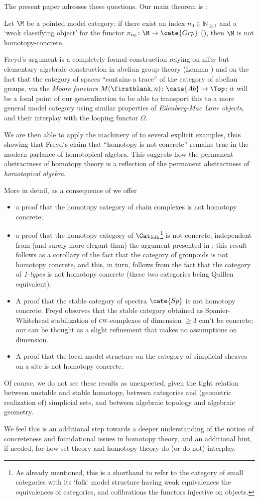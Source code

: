 The present paper adresses these questions. Our main theorem is
:
\begin{theorem*}
Let $\M$ be a pointed model category; if there exist an index $n_0 \in \mathbb{N}_{\ge
1}$ and a `weak classifying object' for the functor $\pi_{n_0} \colon \M \to
\cate{Grp}$ (\adef{}), then $\M$ is not homotopy\hyp{}concrete.
\end{theorem*}
Freyd's argument is a completely formal construction relying on nifty but elementary algebraic construction in abelian group theory (Lemma ) and on the fact that the category
of spaces ``contains a trace'' of the category of abelian groups, via the
\emph{Moore functors} $M(\firstblank,n) \colon \cate{Ab}\to \Top$; it will be a
focal point of our generalization to be able to transport this to a more general
model category using similar properties of \emph{Eilenberg-Mac Lane objects},
and their interplay with the looping functor $\Omega$.

We are then able to apply the machinery of \athm{} to several
explicit examples, thus showing that Freyd`s claim that ``homotopy is not
concrete'' remains true in the modern parlance of homotopical algebra. This
suggests how the permanent abstractness of homotopy theory is a reflection of
the permanent abstractness of \emph{homotopical algebra}.

More in detail, as a consequence of \athm{} we offer
\begin{itemize}
	\item a proof that the homotopy category of chain complexes is not homotopy concrete;
	\item a proof that the homotopy category of $\Cat_\text{folk}$\footnote{As
already mentioned, this is a shorthand to refer to the category of small
categories with its `folk' model structure having weak equivalences the
equivalences of categories, and cofibrations the functors injective on objects.}
is not concrete, independent from (and surely more elegant than) the argument
presented in \cite[§4.1]{fconc}; this result follows as a corollary of the fact
that the category of groupoids is not homotopy concrete, and this, in turn,
follows from the fact that the category of \emph{1-types} is not homotopy
concrete (these two categories being Quillen equivalent).
	\item A proof that the stable category of spectra $\cate{Sp}$ is not homotopy
concrete. Freyd \cite{Freydconc} observes that the stable category obtained as
Spanier-Whitehead stabilization of \textsc{cw}-complexes of dimension $\ge 3$
can't be concrete; our  can be thought as a slight refinement
that makes no assumptions on dimension.
	\item A proof that the local model structure
\cite{jardine1987simplical,dugger2004hypercovers} on the category of simplicial
sheaves on a site is not homotopy concrete.
\end{itemize}
Of course, we do not see these results as unexpected, given the tight relation
between unstable and stable homotopy, between categories and (geometric
realization of) simplicial sets, and between algebraic topology and algebraic
geometry.

We feel this is an additional step towards a deeper understanding of the notion
of concreteness and foundational issues in homotopy theory, and an additional
hint, if needed, for how set theory and homotopy theory do (or do not)
interplay.